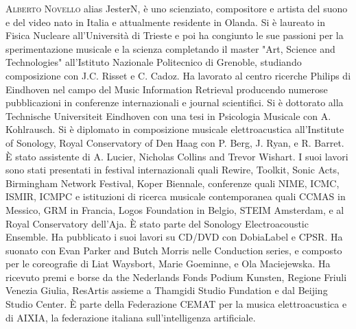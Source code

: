 \documentclass[9pt, twoside, a5paper]{extreport}
\newcommand{\biografia}[2]{%
\noindent \textsc{#1} %
#2 %
\medskip
}%
\begin{document}
\begin{multicols}{2}
\biografia{Alberto Novello}{alias JesterN, è uno scienziato, compositore e artista del suono e del video nato in Italia e attualmente residente in Olanda. Si è laureato in Fisica Nucleare all'Università di Trieste e poi ha congiunto le sue passioni per la sperimentazione musicale e la scienza completando il master "Art, Science and Technologies" all'Istituto Nazionale Politecnico di Grenoble, studiando composizione con J.C. Risset e C. Cadoz. Ha lavorato al centro ricerche Philips di Eindhoven nel campo del Music Information Retrieval producendo numerose pubblicazioni in conferenze internazionali e journal scientifici. Si è dottorato alla Technische Universiteit Eindhoven con una tesi in Psicologia Musicale con A. Kohlrausch. Si è diplomato in composizione musicale elettroacustica all'Institute of Sonology, Royal Conservatory of Den Haag con P. Berg, J. Ryan, e R. Barret. È stato assistente di A. Lucier, Nicholas Collins and Trevor Wishart. I suoi lavori sono stati presentati in festival internazionali quali Rewire, Toolkit, Sonic Acts, Birmingham Network Festival, Koper Biennale, conferenze quali NIME, ICMC, ISMIR, ICMPC e istituzioni di ricerca musicale contemporanea quali CCMAS in Messico, GRM in Francia, Logos Foundation in Belgio, STEIM Amsterdam, e al Royal Conservatory dell'Aja. È stato parte del Sonology Electroacoustic Ensemble. Ha pubblicato i suoi lavori su CD/DVD con DobiaLabel e CPSR. Ha suonato con Evan Parker and Butch Morris nelle Conduction series, e composto per le coreografie di Liat Waysbort, Marie Goeminne, e Ola Maciejewska. Ha ricevuto premi e borse da the Nederlands Fonds Podium Kunsten, Regione Friuli Venezia Giulia, ResArtis assieme a Thamgidi Studio Fundation e dal Beijing Studio Center. È parte della Federazione CEMAT per la musica elettroacustica e di AIXIA, la federazione italiana sull'intelligenza artificiale.}


\end{multicols}
\end{document}
